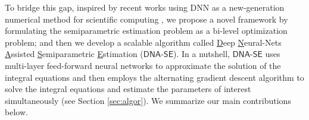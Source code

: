 \documentclass{article}
\def\dnase{{\mathsf{DNA\mbox{-}SE}}}
\theoremstyle{plain}
\theoremstyle{definition}
\theoremstyle{remark}
\begin{document}
To bridge this gap, inspired by recent works using DNN as a new-generation numerical method for scientific computing \citep{e2018deep, raissi2019physics, li2020multi}, we propose a novel framework by formulating the semiparametric estimation problem as a bi-level optimization problem; and then we develop a scalable algorithm called \underline{D}eep \underline{N}eural-Nets \underline{A}ssisted \underline{S}emiparametric \underline{E}stimation ($\dnase$). In a nutshell, $\dnase$ uses multi-layer feed-forward neural networks to approximate the solution of the integral equations and then employs the alternating gradient descent algorithm to solve the integral equations and estimate the parameters of interest simultaneously (see Section \ref{sec:algor}). We summarize our main contributions below.


\end{document}
